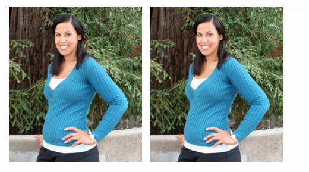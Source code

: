 \documentclass[landscape,a0paper,fontscale=0.292]{baposter}
\begin{document}
\begin{poster}
{\begin{center}
\begin{tabularx}{\linewidth}{X X X X }
\includegraphics[width=\linewidth]{onasafari.jpg}&
\includegraphics[width=\linewidth]{onasafari.jpg}&

\end{tabularx}
\end{center}}
\end{poster}
\end{document}
